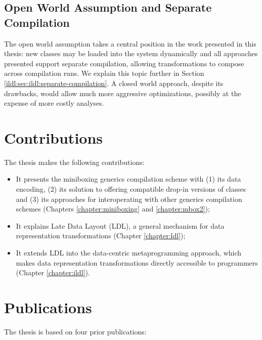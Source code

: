 \subsection{Open World Assumption and Separate Compilation}

The open world assumption takes a central position in the work presented in this thesis: new classes may be loaded into the system dynamically and all approaches presented support separate compilation, allowing transformations to compose across compilation runs. We explain this topic further in Section \ref{ildl:sec:ildl:separate-compilation}. A closed world approach, despite its drawbacks, would allow much more aggressive optimizations, possibly at the expense of more costly analyses.

\newpage

\section{Contributions}

The thesis makes the following contributions:

\begin{itemize}
  \item It presents the miniboxing generics compilation scheme with (1) its data encoding, (2) its solution to offering compatible drop-in versions of classes and (3) its approaches for interoperating with other generics compilation schemes (Chapters \ref{chapter:miniboxing} and \ref{chapter:mbox2});
  \item It explains Late Data Layout (LDL), a general mechanism for data representation transformations (Chapter \ref{chapter:ldl});
  \item It extends LDL into the data-centric metaprogramming approach, which makes data representation transformations directly accessible to programmers (Chapter \ref{chapter:ildl}).
\end{itemize}

\section{Publications}

The thesis is based on four prior publications:

